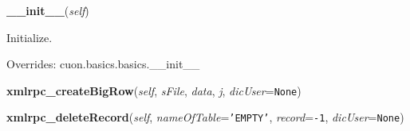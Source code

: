 \hspace{.8\funcindent}\begin{boxedminipage}{\funcwidth}

    \raggedright \textbf{\_\_init\_\_}(\textit{self})

\setlength{\parskip}{2ex}
    Initialize.

\setlength{\parskip}{1ex}
      Overrides: cuon.basics.basics.\_\_init\_\_

    \end{boxedminipage}

    \label{cuon:SQL:SQL:xmlrpc_createBigRow}

    \vspace{0.5ex}

\hspace{.8\funcindent}\begin{boxedminipage}{\funcwidth}

    \raggedright \textbf{xmlrpc\_createBigRow}(\textit{self}, \textit{sFile}, \textit{data}, \textit{j}, \textit{dicUser}={\tt None})

\setlength{\parskip}{2ex}
\setlength{\parskip}{1ex}
    \end{boxedminipage}

    \label{cuon:SQL:SQL:xmlrpc_deleteRecord}

    \vspace{0.5ex}

\hspace{.8\funcindent}\begin{boxedminipage}{\funcwidth}

    \raggedright \textbf{xmlrpc\_deleteRecord}(\textit{self}, \textit{nameOfTable}={\tt \texttt{'}\texttt{EMPTY}\texttt{'}}, \textit{record}={\tt -1}, \textit{dicUser}={\tt None})

\setlength{\parskip}{2ex}
\setlength{\parskip}{1ex}
    \end{boxedminipage}

    \label{cuon:SQL:SQL:xmlrpc_executeNormalQuery}

    \vspace{0.5ex}

